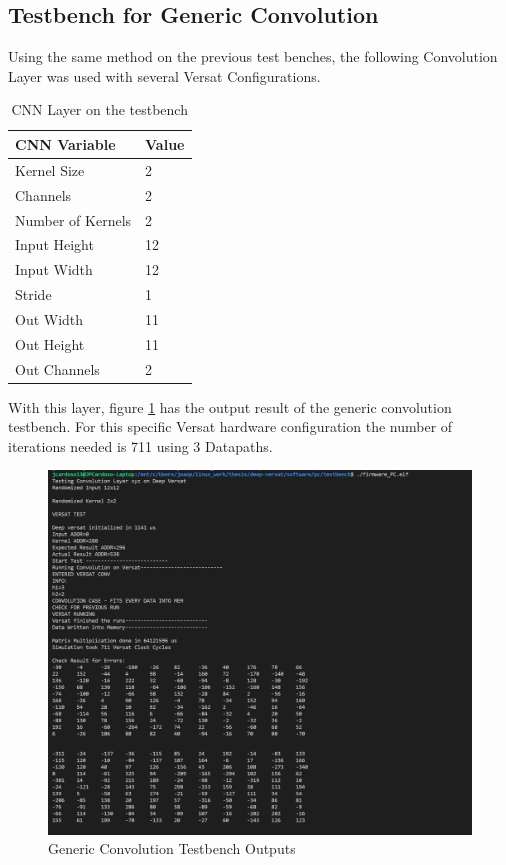 \subsection{Testbench for Generic Convolution}

Using the same method on the previous test benches, the following Convolution Layer was used
with several Versat Configurations.

\begin{table}[!htpb]
    \centering
    \begin{tabular}{ll}
    \hline
    \textbf{CNN Variable} & \textbf{Value}        \\ \hline
    Kernel Size            & 2                 \\
    Channels            & 2                       \\
    Number of Kernels            & 2                       \\
    Input Height                  & 12                        \\
    Input Width                & 12                  \\
    Stride              & 1                     \\
    Out Width               & 11                      \\
    Out Height            & 11  \\
    Out Channels                   & 2                     \\ \hline
    \end{tabular}
    \label{table:convInput}
    \caption{CNN Layer on the testbench}
\end{table}

With this layer, figure \ref{figure:test3} has the output result of the generic convolution testbench.
For this specific Versat hardware configuration the number of iterations needed is 711 using 3 Datapaths.

\begin{figure}[!htbp]
    \centering
    \includegraphics[width=\textwidth]{Figures/test3.png}
    \caption{Generic Convolution Testbench Outputs}
    \label{figure:test3}
\end{figure}

